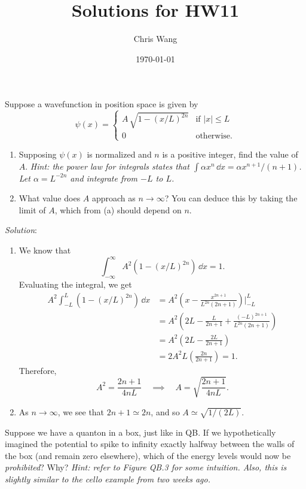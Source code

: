 \documentclass{article}
\title{Solutions for HW11}
\author{Chris Wang}
\date{\today}
\begin{document}
\maketitle

\begin{tcolorbox}[colframe=blue!50!black, arc=2mm, title=\textsc{Practice 1}]
    Suppose a wavefunction in position space is given by 
    \[
    \psi(x) = \begin{cases}
    A\, \sqrt{1-(x/L)^{2n}} & \text{if } |x| \le L \\
    0 & \text{otherwise}.
    \end{cases}
    \]
    \begin{enumerate}[label=(\alph*)]
    \item Supposing $\psi(x)$ is normalized and $n$ is a positive integer, find the value of $A$. \textit{Hint: the power law for integrals states that $\int \alpha x^n \, \dd x = \alpha x^{n+1} / (n+1)$. Let $\alpha = L^{-2n}$ and integrate from $-L$ to $L$.}
    \item What value does $A$ approach as $n \to \infty$? You can deduce this by taking the limit of $A$, which from (a) should depend on $n$.
    \end{enumerate}
\end{tcolorbox}

\textit{Solution}:

\begin{enumerate}[label=(\alph*)]
    \item We know that 
    \[
    \int_{-\infty}^{\infty} A^2 (1-(x/L)^{2n}) \, \dd x = 1.
    \]
    Evaluating the integral, we get
    \begin{align*}
    A^2 \int_{-L}^{L} (1-(x/L)^{2n}) \, \dd x &= A^2 \left( x-\frac{x^{2n+1}}{L^{2n}(2n+1)} \right)\bigg|_{-L}^{L} \\[0.8em]
    &= A^2 \left( 2L - \frac{L}{2n+1} + \frac{(-L)^{2n+1}}{L^{2n}(2n+1)}  \right) \\[0.8em]
    &= A^2 \left( 2L - \frac{2L}{2n+1} \right) \\[0.8em]
    &= 2A^2 L \left( \frac{2n}{2n+1} \right) = 1.
    \end{align*}
    Therefore,
    \[
    A^2 = \frac{2n+1}{4nL} \quad \implies \quad A = \sqrt{\frac{2n+1}{4nL}}.
    \]
    \item As $n\to\infty$, we see that $2n+1 \simeq 2n$, and so $A \simeq \sqrt{1/(2L)}$.
\end{enumerate}

\begin{tcolorbox}[colframe=blue!50!black, arc=2mm, title=\textsc{Practice 2}]
    Suppose we have a quanton in a box, just like in QB. If we hypothetically imagined the potential to spike to infinity exactly halfway between the walls of the box (and remain zero elsewhere), which of the energy levels would now be \textit{prohibited}? Why? \textit{Hint: refer to Figure QB.3 for some intuition. Also, this is slightly similar to the cello example from two weeks ago.}
\end{tcolorbox}
\end{document}
